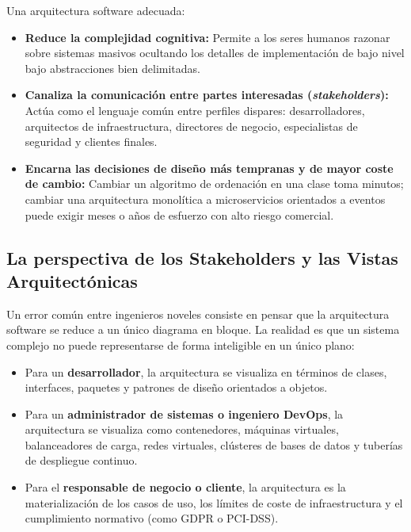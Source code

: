Una arquitectura software adecuada:
\begin{itemize}[leftmargin=1.5em]
  \item \textbf{Reduce la complejidad cognitiva:} Permite a los seres humanos razonar sobre sistemas masivos ocultando los detalles de implementación de bajo nivel bajo abstracciones bien delimitadas.
  \item \textbf{Canaliza la comunicación entre partes interesadas (\emph{stakeholders}):} Actúa como el lenguaje común entre perfiles dispares: desarrolladores, arquitectos de infraestructura, directores de negocio, especialistas de seguridad y clientes finales.
  \item \textbf{Encarna las decisiones de diseño más tempranas y de mayor coste de cambio:} Cambiar un algoritmo de ordenación en una clase toma minutos; cambiar una arquitectura monolítica a microservicios orientados a eventos puede exigir meses o años de esfuerzo con alto riesgo comercial.
\end{itemize}

\subsection{La perspectiva de los Stakeholders y las Vistas Arquitectónicas}

Un error común entre ingenieros noveles consiste en pensar que la arquitectura software se reduce a un único diagrama en bloque. La realidad es que un sistema complejo no puede representarse de forma inteligible en un único plano:
\begin{itemize}[leftmargin=1.5em]
  \item Para un \textbf{desarrollador}, la arquitectura se visualiza en términos de clases, interfaces, paquetes y patrones de diseño orientados a objetos.
  \item Para un \textbf{administrador de sistemas o ingeniero DevOps}, la arquitectura se visualiza como contenedores, máquinas virtuales, balanceadores de carga, redes virtuales, clústeres de bases de datos y tuberías de despliegue continuo.
  \item Para el \textbf{responsable de negocio o cliente}, la arquitectura es la materialización de los casos de uso, los límites de coste de infraestructura y el cumplimiento normativo (como GDPR o PCI-DSS).
\end{itemize}

